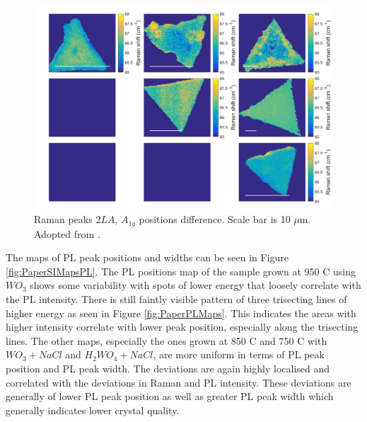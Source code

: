 \begin{figure}[h]
	\begin{center}
		\includegraphics[scale=0.3]{PaperSIMapsDifference.png}
		\caption{Raman peaks $2LA$, $A_{1g}$ positions difference. Scale bar is 10 $\mu$m. Adopted from \cite{Reale2017}.}
		\label{fig:PaperSIMapsDifference}
	\end{center}
\end{figure}

The maps of PL peak positions and widths can be seen in Figure \ref{fig:PaperSIMapsPL}. The PL positions map of the sample grown at 950 {\degree}C using $WO_3$ shows some variability with spots of lower energy that loosely correlate with the PL intensity. There is still faintly visible pattern of three trisecting lines of higher energy as seen in Figure \ref{fig:PaperPLMaps}. This indicates the areas with higher intensity correlate with lower peak position, especially along the trisecting lines. The other maps, especially the ones grown at 850 {\degree}C and 750 {\degree}C with $WO_3 + NaCl$ and $H_2WO_4 + NaCl$, are more uniform in terms of PL peak position and PL peak width. The deviations are again highly localised and correlated with the deviations in Raman and PL intensity. These deviations are generally of lower PL peak position as well as greater PL peak width which generally indicates lower crystal quality.

